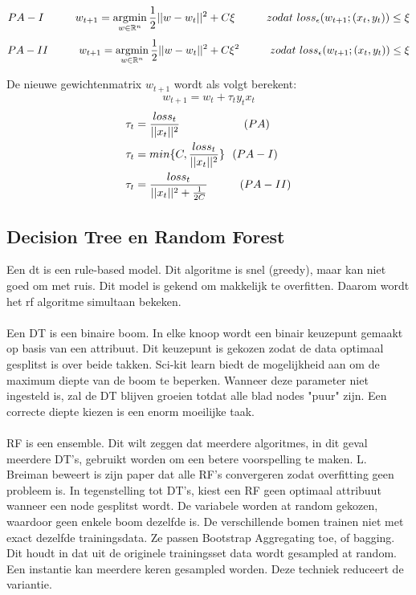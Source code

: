 \[
   PA-I \hspace*{1cm} w_{t+1}= \operatorname*{argmin}_{w \in \mathbb{R}^n}
     \frac{1}{2}||w-w_t||^2 + C\xi \hspace*{1cm} zodat \ loss_{\epsilon} (w_{t+1};(x_t,y_t)) \leq \xi
\]
\[
   PA-II \hspace*{1cm} w_{t+1}= \operatorname*{argmin}_{w \in \mathbb{R}^n}
     \frac{1}{2}||w-w_t||^2 + C\xi^2 \hspace*{1cm} zodat \ loss_{\epsilon} (w_{t+1};(x_t,y_t)) \leq \xi
\]

De nieuwe gewichtenmatrix $w_{t+1}$ wordt als volgt berekent:
\[
w_{t+1}=w_t+ \tau_t y_t x_t
\]
\begin{align*}
\tau_t &= \frac{loss_t}{||x_t||^2} \tab \tab (PA)\\
\tau_t &= min \{ C, \frac{loss_t}{||x_t||^2} \} \ \ (PA-I)\\
\tau_t &= \frac{loss_t}{||x_t||^2+\frac{1}{2C}} \tab (PA-II) 
\end{align*}


\subsection{Decision Tree en Random Forest}
Een \gls{dt} is een rule-based model. Dit algoritme is snel (greedy), maar kan niet goed om met ruis. Dit model is gekend om makkelijk te overfitten. Daarom wordt het \gls{rf} algoritme simultaan bekeken.
\\\\
Een DT is een binaire boom. In elke knoop wordt een binair keuzepunt gemaakt op basis van een attribuut. Dit keuzepunt is gekozen zodat de data optimaal gesplitst is over beide takken. Sci-kit learn biedt de mogelijkheid aan om de maximum diepte van de boom te beperken. Wanneer deze parameter niet ingesteld is, zal de DT blijven groeien totdat alle blad nodes "puur" zijn. Een correcte diepte kiezen is een enorm moeilijke taak.
\\\\ 
RF is een ensemble. Dit wilt zeggen dat meerdere algoritmes, in dit geval meerdere DT’s, gebruikt worden om een betere voorspelling te maken. L. Breiman \cite{randomforest paper} beweert is zijn paper dat alle RF’s convergeren zodat overfitting geen probleem is. In tegenstelling tot DT’s, kiest een RF geen optimaal attribuut wanneer een node gesplitst wordt. De variabele worden at random gekozen, waardoor geen enkele boom dezelfde is. De verschillende bomen trainen niet met exact dezelfde trainingsdata. Ze passen Bootstrap Aggregating toe, of bagging. Dit houdt in dat uit de originele trainingsset data wordt gesampled at random. Een instantie kan meerdere keren gesampled worden. Deze techniek reduceert de variantie.
